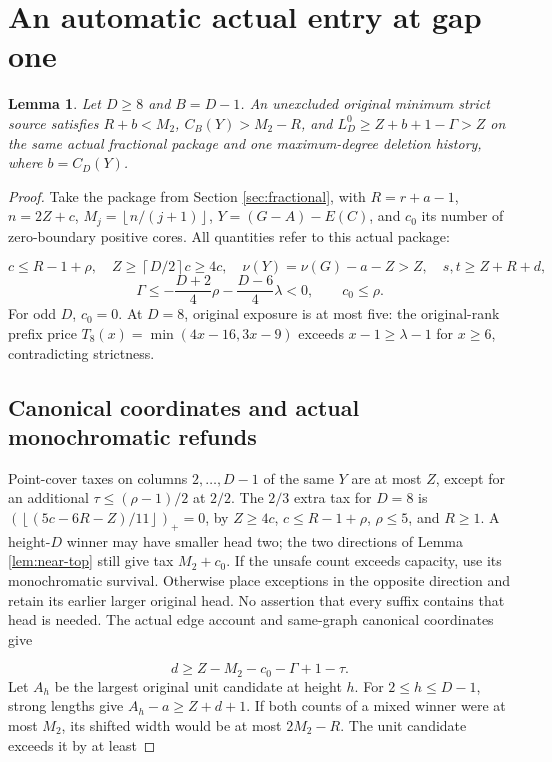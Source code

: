 \documentclass[11pt,a4paper]{article}
\newcommand{\pos}[1]{\left(#1\right)_+}
\newcommand{\floor}[1]{\left\lfloor#1\right\rfloor}
\newcommand{\ceil}[1]{\left\lceil#1\right\rceil}
\newtheorem{lemma}[theorem]{Lemma}
\theoremstyle{definition}
\begin{document}
\section{An automatic actual entry at gap one}\label{app:gap1-entry}
\begin{lemma}\label{lem:gap1-entry}
Let $D\ge8$ and $B=D-1$. An unexcluded original minimum strict source satisfies
$R+b<M_2$, $C_B(Y)>M_2-R$, and $L_D^0\ge Z+b+1-\Gamma>Z$
on the same actual fractional package and one maximum-degree deletion history,
where $b=C_D(Y)$.
\end{lemma}
\begin{proof}
Take the package from Section \ref{sec:fractional}, with
$R=r+a-1$, $n=2Z+c$, $M_j=\floor{n/(j+1)}$,
$Y=(G-A)-E(C)$, and $c_0$ its number of zero-boundary positive cores.
All quantities refer to this actual package:

\[
c\le R-1+\rho,\quad Z\ge\ceil{D/2}c\ge4c,\quad
\nu(Y)=\nu(G)-a-Z>Z,\quad s,t\ge Z+R+d,
\]
\[
\Gamma\le-\frac{D+2}{4}\rho-\frac{D-6}{4}\lambda<0,\qquad c_0\le\rho.
\]
For odd $D$, $c_0=0$. At $D=8$, original exposure is at most five:
the original-rank prefix price $T_8(x)=\min(4x-16,3x-9)$ exceeds
$x-1\ge\lambda-1$ for $x\ge6$, contradicting strictness.

\subsection*{Canonical coordinates and actual monochromatic refunds}
Point-cover taxes on columns $2,\ldots,D-1$ of the same $Y$ are at most $Z$,
except for an additional $\tau\le(\rho-1)/2$ at $2/2$.
The $2/3$ extra tax for $D=8$ is
$\pos{\floor{(5c-6R-Z)/11}}=0$,
by $Z\ge4c$, $c\le R-1+\rho$, $\rho\le5$, and $R\ge1$.
A height-$D$ winner may have smaller head two;
the two directions of Lemma \ref{lem:near-top} still give tax $M_2+c_0$.
If the unsafe count exceeds capacity, use its monochromatic survival.
Otherwise place exceptions in the opposite direction and retain its earlier
larger original head. No assertion that every suffix contains that head is needed.
The actual edge account and same-graph canonical coordinates give

\begin{equation}\label{eq:gap1-dgate}
d\ge Z-M_2-c_0-\Gamma+1-\tau.
\end{equation}
Let $A_h$ be the largest original unit candidate at height $h$.
For $2\le h\le D-1$, strong lengths give $A_h-a\ge Z+d+1$.
If both counts of a mixed winner were at most $M_2$,
its shifted width would be at most $2M_2-R$. The unit candidate exceeds it by at least


\end{proof}
\end{document}

